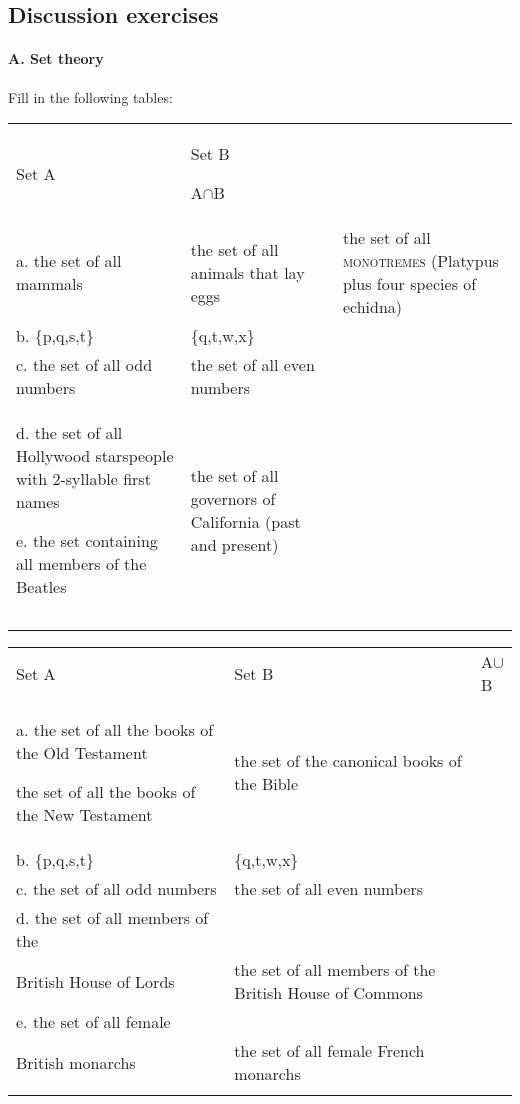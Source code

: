 \subsection*{Discussion exercises}
\paragraph{A. Set theory}

Fill in the following tables:

\ea \label{ex:13.}%
    \label{ex:key:1}




        

\begin{tabularx}{\textwidth}{XXX}
\lsptoprule

 Set A & Set B\par

 A${\cap}$B & \\
a. the set of all mammals & the set of all animals that lay eggs & the set of all \textsc{monotremes} (Platypus plus four species of echidna)\\
b. \{p,q,s,t\} & \{q,t,w,x\} & \\
c. the set of all odd numbers & the set of all even numbers & \\
d. the set of all Hollywood starspeople with 2-syllable first names

e. the set containing all members of the Beatles & the set of all governors of California (past and present) & \\
&  & \\
\lspbottomrule
\end{tabularx}
 \z
 
\ea \label{ex:13.}%
    \label{ex:key:2}




        

\begin{tabularx}{\textwidth}{XXX}
\lsptoprule

 Set A & Set B & A${\cup}$B\\
a. the set of all the books of the Old Testament
   
the set of all the books of the New Testament & the set of the canonical books of the Bible & \\
b. \{p,q,s,t\} & \{q,t,w,x\} & \\
c. the set of all odd numbers & the set of all even numbers & \\
d. the set of all members of the \\
    British House of Lords & the set of all members of the British House of Commons & \\
e. the set of all female\\
    British monarchs & the set of all female French monarchs\footnotemark{} & \\
\lspbottomrule
\end{tabularx}

